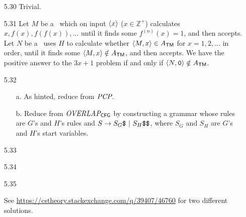 \begin{itemize}
	\item[5.30]
	Trivial.
	
	\item[5.31]
	Let $M$ be a \TM\ which on input $\Bra{x}$ ($x \in \mathbb{Z}^+$) calculates $x, f(x), f(f(x)), \dots$ until it finds some $f^{(n)}(x)	= 1$, and then accepts. Let $N$ be a \TM\ uses $H$ to calculate whether $\Bra{M, x} \in A_{\TM}$ for $x = 1, 2, \dots$ in order, until it finds some $\Bra{M, x} \notin A_{\TM}$, and then accepts. We have the positive answer to the $3x + 1$ problem if and only if $\Bra{N, \TT{0}} \notin A_{\TM}$. 
	
	\item[5.32]
	\begin{itemize}
		\item[a.] As hinted, reduce from $\IT{PCP}$.
		\item[b.] Reduce from $\IT{OVERLAP}_{\CFG}$ by constructing a grammar whose rules are $G$'s and $H$'s rules and $S \to S_G \TT{\$} \ | \ S_H \TT{\$\$}$, where $S_G$ and $S_H$ are $G$'s and $H$'s start variables.
	\end{itemize}

	\item[5.33]
	\Empty
	
	\item[5.34]
	\Empty
	
	\item[5.35]
	\Empty
	
	\item[\Star 5.36]
	See \url{https://cstheory.stackexchange.com/q/39407/46760} for two different solutions.
	
\end{itemize}